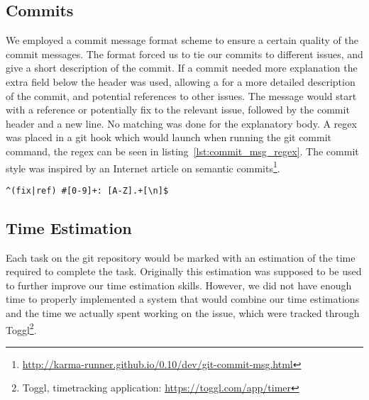 \subsection{Commits}
We employed a commit message format scheme to ensure a certain quality of the commit messages.
The format forced us to tie our commits to different issues, and give a short description of the commit.
If a commit needed more explanation the extra field below the header was used,
allowing a for a more detailed description of the commit, and potential references to other issues.
The message would start with a reference or potentially fix to the relevant issue,
followed by the commit header and a new line.
No matching was done for the explanatory body.
A regex was placed in a git hook which would launch when running the git commit command, the regex can be seen in listing~\ref{lst:commit_msg_regex}.
The commit style was inspired by an Internet article on semantic commits\footnote{\url{http://karma-runner.github.io/0.10/dev/git-commit-msg.html}}.

\begin{lstlisting}[xleftmargin=18.0ex, caption=Commit Message Regex, captionpos=b, label=lst:commit_msg_regex]
^(fix|ref) #[0-9]+: [A-Z].+[\n]$
\end{lstlisting}

\subsection{Time Estimation}
Each task on the git repository would be marked with an estimation of the time required to complete the task.
Originally this estimation was supposed to be used to further improve our time estimation skills.
However, we did not have enough time to properly implemented a system that would combine our time estimations
and the time we actually spent working on the issue, which were tracked through Toggl\footnote{Toggl, timetracking application: \url{https://toggl.com/app/timer}}.
